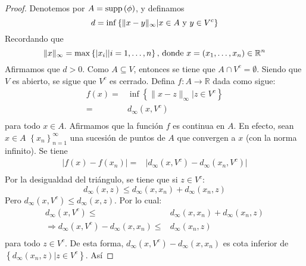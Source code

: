 \documentclass[12pt]{report}
\theoremstyle{largebreak}
\newcommand\abs[1]{\ensuremath{\lvert#1\rvert}}
\newcommand\cf[3]{\ensuremath{#1:#2\rightarrow#3}}
\newcommand\supp[1]{\ensuremath{\textup{supp}\left(#1\right)}}
\begin{document}
\begin{proof}
    Denotemos por $A=\supp{\phi}$, y definamos
    \begin{equation*}
        d=\inf\left\{\|x-y\|_{\infty}|x\in A \textup{ y }y\in V^c\right\}
    \end{equation*}
    Recordando que 
    \begin{equation*}
        \|x\|_{\infty}=\max\left\{\abs{x_i}|i=1,\dots,n\right\}\textup{, donde }x=\left(x_1,\dots,x_n\right)\in\mathbb{R}^n
    \end{equation*}
    Afirmamos que $d>0$. Como $A\subseteq V$, entonces se tiene que $A\cap V^c=\emptyset$. Siendo que $V$ es abierto, se sigue que $V^c$ es cerrado. Defina $\cf{f}{A}{\mathbb{R}}$ dada como sigue:
    \begin{equation*}
        \begin{split}
            f(x)=&\inf\left\{\|x-z\|_{\infty}|z\in V^c\right\}\\
            =&d_\infty(x,V^c)\\
        \end{split}
    \end{equation*}
    para todo $x\in A$. Afirmamos que la función $f$ es continua en $A$. En efecto, sean $x\in A$ $\left\{x_n\right\}_{n=1}^{\infty}$ una sucesión de puntos de $A$ que convergen a $x$ (con la norma infinito). Se tiene
    \begin{equation}
        \begin{split}
            \abs{f(x)-f(x_n)}=&\abs{d_\infty(x,V^c)-d_\infty(x_n,V^c)}\\
        \end{split}
    \end{equation}
    Por la desigualdad del triángulo, se tiene que si $z\in V^c$:
    \begin{equation*}
        d_{\infty}(x,z)\leq d_{\infty}(x,x_n)+d_{\infty}(x_n,z)
    \end{equation*}
    Pero $d_{\infty}(x,V^c)\leq d_{\infty}(x,z)$. Por lo cual:
    \begin{equation*}
        \begin{split}
            d_{\infty}(x,V^c)\leq&d_{\infty}(x,x_n)+d_{\infty}(x_n,z)\\
            \Rightarrow d_{\infty}(x,V^c)-d_{\infty}(x,x_n)\leq&d_{\infty}(x_n,z)\\
        \end{split}
    \end{equation*}
    para todo $z\in V^c$. De esta forma, $d_{\infty}(x,V^c)-d_{\infty}(x,x_n)$ es cota inferior de $\left\{d_{\infty}(x_n,z)|z\in V^c\right\}$. Así

\end{proof}
\end{document}
